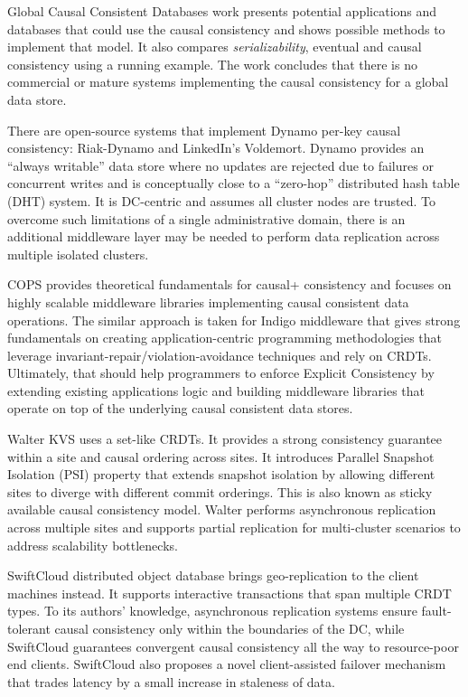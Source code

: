 \documentclass[conference]{IEEEtran}
\begin{document}
Global Causal Consistent Databases\cite{b6} work presents potential
applications and databases that could use the causal consistency and shows
possible methods to implement that model. It also compares
\textit{serializability}\cite{b4}, eventual and causal consistency using a
running example. The work concludes that there is no commercial or mature
systems implementing the causal consistency for a global data store.

There are open-source systems that implement Dynamo\cite{b17} per-key causal
consistency: Riak-Dynamo\cite{b19} and LinkedIn's Voldemort\cite{b20}. Dynamo
provides an ``always writable'' data store where no updates are rejected due
to failures or concurrent writes and is conceptually close to a ``zero-hop''
distributed hash table (DHT) system. It is DC-centric and assumes all cluster
nodes are trusted. To overcome such limitations of a single administrative
domain, there is an additional middleware layer may be needed to perform data
replication across multiple isolated clusters.

COPS\cite{b1} provides theoretical fundamentals for causal+ consistency and
focuses on highly scalable middleware libraries implementing causal consistent
data operations. The similar approach is taken for Indigo middleware\cite{b10}
that gives strong fundamentals on creating application-centric programming
methodologies that leverage invariant-repair/violation-avoidance techniques and
rely on CRDTs. Ultimately, that should help programmers to enforce Explicit
Consistency by extending existing applications logic and building middleware
libraries that operate on top of the underlying causal consistent data stores.

Walter\cite{b11} KVS uses a set-like CRDTs. It provides a strong consistency
guarantee within a site and causal ordering across sites. It introduces
Parallel Snapshot Isolation (PSI) property that extends snapshot isolation by
allowing different sites to diverge with different commit orderings. This is
also known as sticky available causal consistency model. Walter performs
asynchronous replication across multiple sites and supports partial replication
for multi-cluster scenarios to address scalability bottlenecks.

SwiftCloud distributed object database\cite{b12} brings geo-replication to the
client machines instead. It supports interactive transactions that span
multiple CRDT types. To its authors' knowledge, asynchronous replication
systems ensure fault-tolerant causal consistency only within the boundaries of
the DC, while SwiftCloud guarantees convergent causal consistency all the way
to resource-poor end clients. SwiftCloud also proposes a novel client-assisted
failover mechanism that trades latency by a small increase in staleness of
data.
\end{document}
